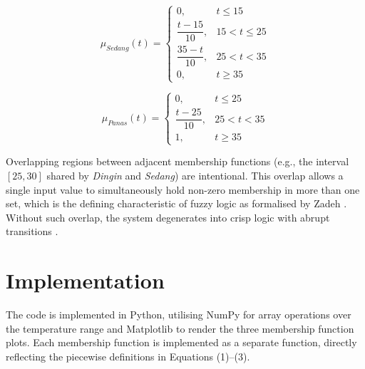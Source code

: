 \documentclass{article}
\begin{document}
\begin{equation}
\mu_{Sedang}(t) =
\begin{cases}
    0,                      & t \leq 15 \\
    \dfrac{t - 15}{10},     & 15 < t \leq 25 \\
    \dfrac{35 - t}{10},     & 25 < t < 35 \\
    0,                      & t \geq 35
\end{cases}
\end{equation}

\begin{equation}
\mu_{Panas}(t) =
\begin{cases}
    0,                      & t \leq 25 \\
    \dfrac{t - 25}{10},     & 25 < t < 35 \\
    1,                      & t \geq 35
\end{cases}
\end{equation}

Overlapping regions between adjacent membership functions (e.g., the interval
$[25, 30]$ shared by \textit{Dingin} and \textit{Sedang}) are intentional. This
overlap allows a single input value to simultaneously hold non-zero membership
in more than one set, which is the defining characteristic of fuzzy logic as
formalised by Zadeh \cite{zadeh1965fuzzy}. Without such overlap, the system
degenerates into crisp logic with abrupt transitions \cite{mamdani1974application}.

\section*{Implementation}

The code is implemented in Python, utilising NumPy \cite{harris2020numpy} for
array operations over the temperature range and Matplotlib
\cite{hunter2007matplotlib} to render the three membership function plots.
Each membership function is implemented as a separate function, directly
reflecting the piecewise definitions in Equations (1)--(3).
\end{document}
